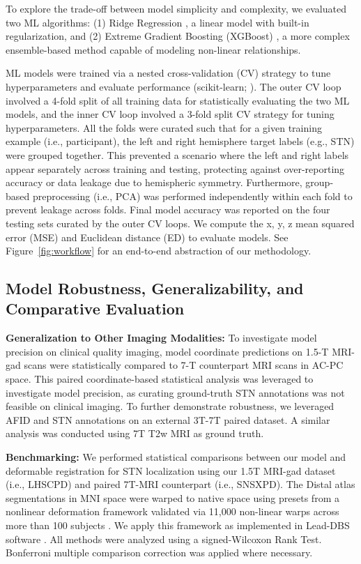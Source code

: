 To explore the trade-off between model simplicity and complexity, we evaluated two ML algorithms: (1) Ridge Regression \cite{ref}, a linear model with built-in regularization, and (2) Extreme Gradient Boosting (XGBoost) \cite{ref}, a more complex ensemble-based method capable of modeling non-linear relationships.

ML models were trained via a nested cross-validation (CV) strategy to tune hyperparameters and evaluate performance (scikit-learn; \cite{pedregosa2012}). The outer CV loop involved a 4-fold split of all training data for statistically evaluating the two ML models, and the inner CV loop involved a 3-fold split CV strategy for tuning hyperparameters. All the folds were curated such that for a given training example (i.e., participant), the left and right hemisphere target labels (e.g., STN) were grouped together. This prevented a scenario where the left and right labels appear separately across training and testing, protecting against over-reporting accuracy or data leakage due to hemispheric symmetry. Furthermore, group-based preprocessing (i.e., PCA) was performed independently within each fold to prevent leakage across folds. Final model accuracy was reported on the four testing sets curated by the outer CV loops. We compute the x, y, z mean squared error (MSE) and Euclidean distance (ED) to evaluate models. See Figure~\ref{fig:workflow} for an end-to-end abstraction of our methodology.

\subsection{Model Robustness, Generalizability, and Comparative Evaluation}

\textbf{Generalization to Other Imaging Modalities:} To investigate model precision on clinical quality imaging, model coordinate predictions on 1.5-T MRI-gad scans were statistically compared to 7-T counterpart MRI scans in AC-PC space. This paired coordinate-based statistical analysis was leveraged to investigate model precision, as curating ground-truth STN annotations was not feasible on clinical imaging. To further demonstrate robustness, we leveraged AFID and STN annotations on an external 3T-7T paired dataset. A similar analysis was conducted using 7T T2w MRI as ground truth.

\textbf{Benchmarking:} We performed statistical comparisons between our model and deformable registration for STN localization using our 1.5T MRI-gad dataset (i.e., LHSCPD) and paired 7T-MRI counterpart (i.e., SNSXPD). The Distal atlas segmentations in MNI space \cite{chakravarty2006, ewert2018} were warped to native space using presets from a nonlinear deformation framework validated via 11,000 non-linear warps across more than 100 subjects \cite{ewert2019}. We apply this framework as implemented in Lead-DBS software \cite{ref}. All methods were analyzed using a signed-Wilcoxon Rank Test. Bonferroni multiple comparison correction was applied where necessary.

